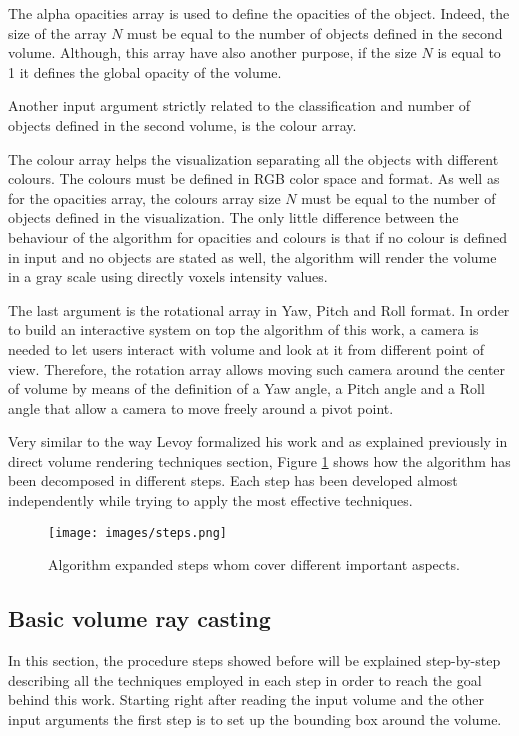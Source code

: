 \documentclass[12pt,a4paper]{extarticle}
\newcommand{\linespace}{\vspace{8pt}}
\begin{document}
The alpha opacities array is used to define the opacities of the object. Indeed, the size of the array $N$ must be equal to the number of objects defined in the second volume. 
Although, this array have also another purpose, if the size $N$ is equal to 1 it defines the global opacity of the volume.

Another input argument strictly related to the classification and number of objects defined in the second volume, is the colour array.
\linespace

The colour array helps the visualization separating all the objects with different colours. The colours must be defined in RGB color space and format.
As well as for the opacities array, the colours array size $N$ must be equal to the number of objects defined in the visualization. The only little difference between the behaviour of the algorithm for opacities and colours is that if no colour is defined in input and no objects are stated as well, the algorithm will render the volume in a gray scale using directly voxels intensity values. 
\linespace

The last argument is the rotational array in Yaw, Pitch and Roll format. In order to build an interactive system on top the algorithm of this work, a camera is needed to let users interact with volume and look at it from different point of view. Therefore, the rotation array allows moving such camera around the center of volume by means of the definition of a Yaw angle, a Pitch angle and a Roll angle that allow a camera to move freely around a pivot point.
\linespace

Very similar to the way Levoy formalized his work and as explained previously in direct volume rendering techniques section,
Figure \ref{fig:steps} shows how the algorithm has been decomposed in different steps. Each step has been developed almost independently while trying to apply the most effective techniques.


\begin{figure}[hbtp]
\centering
\texttt{[image: images/steps.png]}
\caption{Algorithm expanded steps whom cover different important aspects.}
\label{fig:steps}
\end{figure}

\subsection{Basic volume ray casting} 
In this section, the procedure steps showed before will be explained step-by-step describing all the techniques employed in each step in order to reach the goal behind this work.
Starting right after reading the input volume and the other input arguments the first step is to set up the bounding box around the volume.
\end{document}
